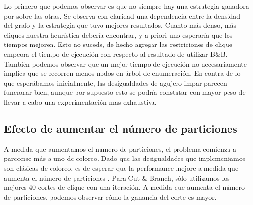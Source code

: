 Lo primero que podemos observar es que no siempre hay una estrategia ganadora por sobre las otras. Se observa con claridad una dependencia entre la densidad del grafo y la estrategia que tuvo mejores resultados. Cuanto más denso, más cliques nuestra heurística debería encontrar, y a priori uno esperaría que los tiempos mejoren. Esto no sucede, de hecho agregar las restriciones de clique empeora el tiempo de ejecución con respecto al resultado de utilizar B\&B. También podemos observar que un mejor tiempo de ejecución no necesariamente implica que se recorren menos nodos en árbol de enumeración. En contra de lo que esperábamos inicialmente, las desigualdades de agujero impar parecen funcionar bien, aunque por supuesto esto se podría constatar con mayor peso de llevar a cabo una experimentación mas exhaustiva.

\subsection{Efecto de aumentar el número de particiones}

A medida que aumentamos el número de particiones, el problema comienza a parecerse más a uno de coloreo. Dado que las desigualdades que implementamos son clásicas de coloreo, es de esperar que la performance mejore a medida que aumenta el número de particiones \cite{coloring}. Para Cut \& Branch, sólo utilizamos los mejores 40 cortes de clique con una iteración. A medida que aumenta el número de particiones, podemos observar cómo la ganancia del corte es mayor.

